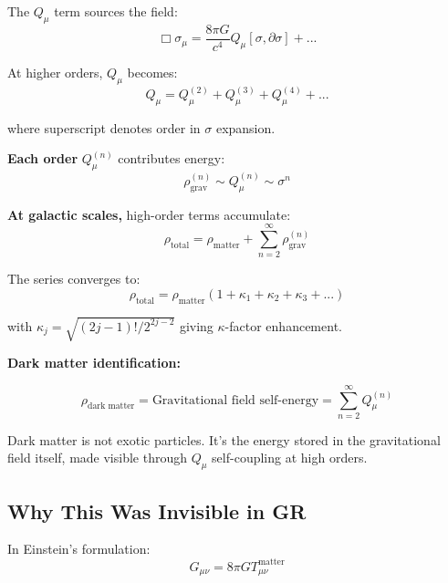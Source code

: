 \documentclass[11pt,a4paper]{article}
\theoremstyle{definition}
\theoremstyle{remark}
\begin{document}
	The $Q_\mu$ term sources the field:
	\begin{equation}
		\Box\sigma_\mu = \frac{8\pi G}{c^4}Q_\mu[\sigma, \partial\sigma] + ...
	\end{equation}
	
	At higher orders, $Q_\mu$ becomes:
	\begin{equation}
		Q_\mu = Q_\mu^{(2)} + Q_\mu^{(3)} + Q_\mu^{(4)} + ... 
	\end{equation}
	
	where superscript denotes order in $\sigma$ expansion.
	
	\textbf{Each order} $Q_\mu^{(n)}$ contributes energy:
	\begin{equation}
		\rho_{\text{grav}}^{(n)} \sim Q_\mu^{(n)} \sim \sigma^n
	\end{equation}
	
	\textbf{At galactic scales,} high-order terms accumulate:
	\begin{equation}
		\rho_{\text{total}} = \rho_{\text{matter}} + \sum_{n=2}^\infty \rho_{\text{grav}}^{(n)}
	\end{equation}
	
	The series converges to:
	\begin{equation}
		\rho_{\text{total}} = \rho_{\text{matter}}\left(1 + \kappa_1 + \kappa_2 + \kappa_3 + ...\right)
	\end{equation}
	
	with $\kappa_j = \sqrt{(2j-1)!/2^{2j-2}}$ giving $\kappa$-factor enhancement.
	
		\textbf{Dark matter identification:}
		
		\begin{equation}
			\boxed{\rho_{\text{dark matter}} = \text{Gravitational field self-energy} = \sum_{n=2}^\infty Q_\mu^{(n)}}
		\end{equation}
		
		Dark matter is not exotic particles. It's the energy stored in the gravitational field itself, made visible through $Q_\mu$ self-coupling at high orders.
	
	\subsection{Why This Was Invisible in GR}
	
	In Einstein's formulation:
	\begin{equation}
		G_{\mu\nu} = 8\pi G T_{\mu\nu}^{\text{matter}}
	\end{equation}
	
\end{document}
